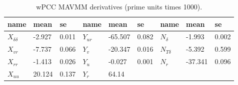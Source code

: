 \begin{table}[h!]
    \footnotesize
    \centering
    \caption{wPCC MAVMM derivatives (prime units times 1000).}
    \label{\detokenize{06.10_results_wpcc:wpcc-derivatives}}
    \begin{tabular}{l l l l l l l l l }
\toprule


name
&

mean
&

se
&

name
&

mean
&

se
&

name
&

mean
&

se
\\
\hline

\( X_{\delta\delta} \)
&

-2.927
&

0.011
&

\( Y_{ur} \)
&

-65.507
&

0.082
&

\( N_{\delta} \)
&

-1.993
&

0.002
\\


\( X_{vr} \)
&

-7.737
&

0.066
&

\( Y_{v} \)
&

-20.347
&

0.016
&

\( N_{T\delta} \)
&

-5.392
&

0.599
\\


\( X_{rr} \)
&

-1.413
&

0.026
&

\( Y_{u} \)
&

-0.027
&

0.001
&

\( N_{r} \)
&

-37.341
&

0.096
\\


\( X_{uu} \)
&

20.124
&

0.137
&

\( Y_{r} \)
&

64.14
&


\end{tabular}
\end{table}
